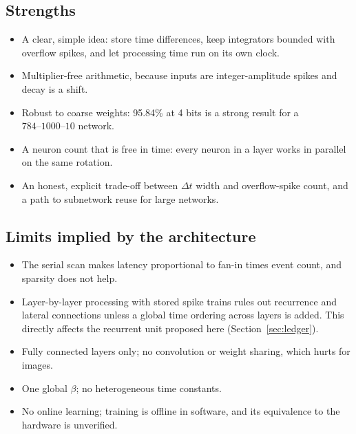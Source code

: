 \subsection{Strengths}
\begin{itemize}[leftmargin=1.5em]
\item A clear, simple idea: store time differences, keep integrators bounded with overflow spikes, and let processing time run on its own clock.
\item Multiplier-free arithmetic, because inputs are integer-amplitude spikes and decay is a shift.
\item Robust to coarse weights: 95.84\% at 4 bits is a strong result for a $784\text{--}1000\text{--}10$ network.
\item A neuron count that is free in time: every neuron in a layer works in parallel on the same rotation.
\item An honest, explicit trade-off between $\Delta t$ width and overflow-spike count, and a path to subnetwork reuse for large networks.
\end{itemize}

\subsection{Limits implied by the architecture}
\begin{itemize}[leftmargin=1.5em]
\item The serial scan makes latency proportional to fan-in times event count, and sparsity does not help.
\item Layer-by-layer processing with stored spike trains rules out recurrence and lateral connections unless a global time ordering across layers is added. This directly affects the recurrent unit proposed here (Section~\ref{sec:ledger}).
\item Fully connected layers only; no convolution or weight sharing, which hurts for images.
\item One global $\beta$; no heterogeneous time constants.
\item No online learning; training is offline in software, and its equivalence to the hardware is unverified.
\end{itemize}

